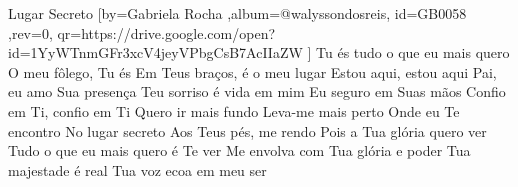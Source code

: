 \beginsong
{Lugar Secreto %
}[by={Gabriela Rocha %
},album={@walyssondosreis},
id={GB0058 %
},rev={0}, %
qr={https://drive.google.com/open?id=1YyWTnmGFr3xcV4jeyVPbgCsB7AcIIaZW %
}]
\beginverse*
Tu és tudo o que eu mais quero
O meu fôlego, Tu és
Em Teus braços, é o meu lugar
Estou aqui, estou aqui
\endverse
\beginverse*
Pai, eu amo Sua presença
Teu sorriso é vida em mim
Eu seguro em Suas mãos
Confio em Ti, confio em Ti
\endverse
\beginchorus
Quero ir mais fundo
Leva-me mais perto
Onde eu Te encontro
No lugar secreto
Aos Teus pés, me rendo
Pois a Tua glória quero ver
\endchorus
\beginverse*
Tudo o que eu mais quero é Te ver
Me envolva com Tua glória e poder
Tua majestade é real
Tua voz ecoa em meu ser
\endverse

